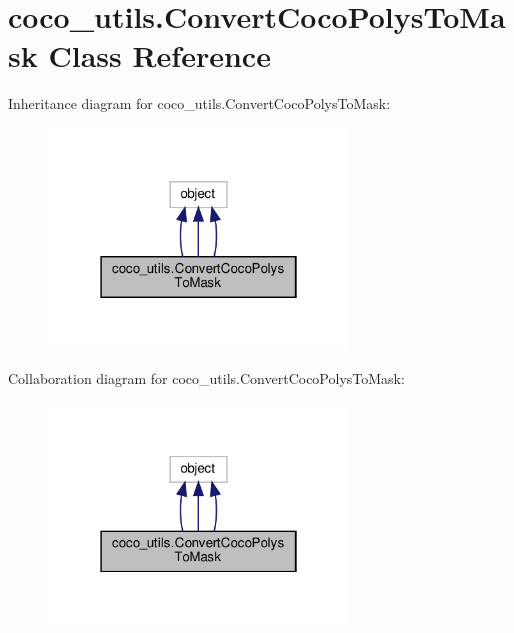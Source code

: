 \hypertarget{classcoco__utils_1_1ConvertCocoPolysToMask}{}\section{coco\+\_\+utils.\+Convert\+Coco\+Polys\+To\+Mask Class Reference}
\label{classcoco__utils_1_1ConvertCocoPolysToMask}


Inheritance diagram for coco\+\_\+utils.\+Convert\+Coco\+Polys\+To\+Mask\+:
\nopagebreak
\begin{figure}[H]
\begin{center}
\leavevmode
\includegraphics[width=226pt]{classcoco__utils_1_1ConvertCocoPolysToMask__inherit__graph}
\end{center}
\end{figure}


Collaboration diagram for coco\+\_\+utils.\+Convert\+Coco\+Polys\+To\+Mask\+:
\nopagebreak
\begin{figure}[H]
\begin{center}
\leavevmode
\includegraphics[width=226pt]{classcoco__utils_1_1ConvertCocoPolysToMask__coll__graph}
\end{center}
\end{figure}
